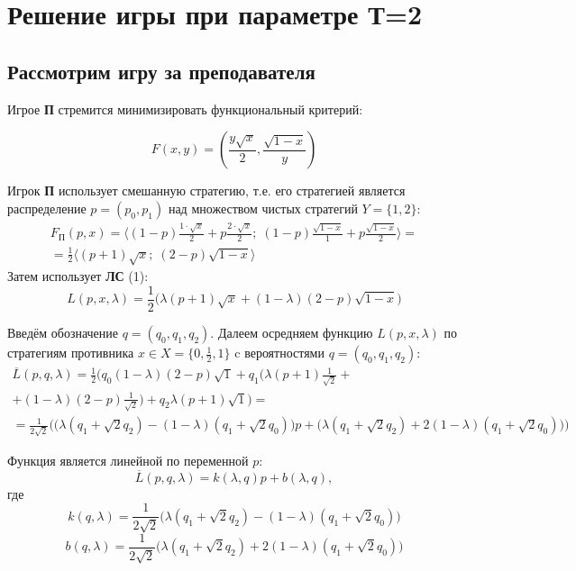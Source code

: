 \section{Решение игры при параметре Т=2}

\subsection{Рассмотрим игру за преподавателя}
\begin{flushleft}

	Игрое \textbf{П} стремится минимизировать функциональный критерий: 
	
	$$F(x, y) = (\frac{y\sqrt{x}}{2},\frac{\sqrt{1-x}}{y})$$	

	Игрок \textbf{П} использует смешанную стратегию, т.е. его стратегией является
	распределение $p=(p_0,p_1)$ над множеством чистых стратегий $Y=\{1,2\}$:\\
	
	\begin{multline*}
	F_\textrm{П}(p,x)=
	\big \langle 
		(1-p)\frac{1 \cdot \sqrt{x}}{2} + p \frac{2 \cdot \sqrt{x}}{2}; \;
		(1-p)\frac{\sqrt{1-x}}{1}+p\frac{\sqrt{1-x}}{2} 
	\big \rangle= \\
	=\frac{1}{2}
	\big \langle
		(p+1)\sqrt{x}; \;
		(2-p)\sqrt{1-x}
	\big \rangle
	\end{multline*}
	Затем использует \textbf{ЛС} (1):
	$$
		L(p,x,\lambda)=
		\frac{1}{2}
		\big(
			\lambda(p+1)\sqrt{x} + (1-\lambda)(2-p)\sqrt{1-x}
		\big)
	$$
	
	Введём обозначение $q=(q_0,q_1,q_2)$. Далеем осредняем 
	функцию $L(p,x,\lambda)$ по стратегиям противника $x \in X=\{0,\frac{1}{2},1\}$ c 
	вероятностями $q=(q_0,q_1,q_2)$:
	\begin{multline*} 
		\overline{L}(p,q,\lambda)=
		\frac{1}{2} 
		\Big(
			q_0(1-\lambda)(2-p)\sqrt{1}+
			q_1 \big (\lambda(p+1)\frac{1}{\sqrt{2}} + \\
			+(1-\lambda)(2-p)\frac{1}{\sqrt{2}} \big )+
			q_2\lambda(p+1)\sqrt{1}
		\Big)=
		\\
		=\frac{1}{2\sqrt{2}}
		\Big (
			\big (\lambda(q_1+\sqrt{2}q_2)-(1-\lambda)(q_1+\sqrt{2}q_0) \big)p+
			\big (\lambda(q_1+\sqrt{2}q_2)+2(1-\lambda)(q_1+\sqrt{2}q_0) \big)
		\Big)
	\end{multline*}
	
	Функция является линейной по переменной $p$:
	$$
		\overline{L}(p,q,\lambda)=k(\lambda,q)p+b(\lambda,q),
	$$
	где
	$$
		k(q, \lambda) = \frac{1}{2\sqrt{2}}
		\big (\lambda(q_1+\sqrt{2}q_2)-(1-\lambda)(q_1+\sqrt{2}q_0) \big)
	$$
	$$
		b(q, \lambda) = \frac{1}{2\sqrt{2}}
		\big (\lambda(q_1+\sqrt{2}q_2)+2(1-\lambda)(q_1+\sqrt{2}q_0) \big)
	$$
	

\end{flushleft}
